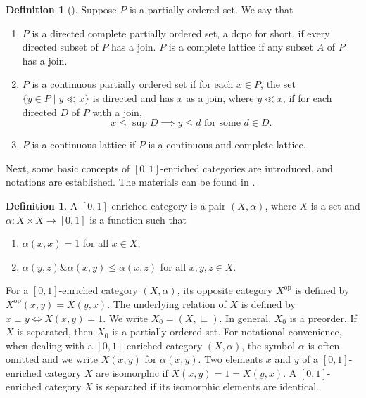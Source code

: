 \documentclass[preprint,3p,times]{elsarticle}
\theoremstyle{plain}
\theoremstyle{definition}
\newtheorem{definition}[thm]{Definition}
\numberwithin{equation}{section}
\begin{document}
\begin{definition}[\cite{Gierz}]
   Suppose \(P\) is a partially  ordered set. We say that 
 \begin{enumerate}[label={\rm(\arabic*)}]
     \item \(P\) is a directed complete partially ordered set, a dcpo for short, if every directed subset of $P$ has a join. \(P\) is a complete lattice  if  any subset \(A\) of \(P\) has a join.
     \item \(P\) is a continuous partially ordered set if for each $x \in P$, the set $\{y \in P \mid y \ll x\}$ is directed and has $x$ as a join, where  \(y \ll x \), if for each directed \(D\) of \(P\) with a join, \[x\le \sup D \implies y\le d \text{ for some \(d\in D.\)}\]
     \item \(P\) is a continuous lattice if \(P\) is a continuous and complete lattice.
 \end{enumerate}

\end{definition}
Next, some basic concepts of \([0,1]\)-enriched categories are introduced, and  notations are established. The materials can be found in \cite{Zhang2024IntroductoryNO,LAI20201,Lai2019CompletelyDE}. 
\begin{definition}
	A \([0,1]\)-enriched category is a pair $(X, \alpha)$, where $X$ is a set and $\alpha: X \times X \to [0,1]$ is a function such that
	\begin{enumerate}[label={\rm(\arabic*)}]
		\item $\alpha(x, x) = 1$ for all $x \in X$;
		\item  $\alpha(y, z) \& \alpha(x, y) \leq \alpha(x, z)$ for all $x, y, z \in X$.
	\end{enumerate}
\end{definition}
For a $[0,1]$-enriched category $(X,\alpha)$, its opposite category
$X^{\mathrm{op}}$ is defined by
\(
X^{\mathrm{op}}(x,y)=X(y,x).
\)
The underlying relation of $X$ is defined by
\(
x\sqsubseteq y
\Longleftrightarrow
X(x,y)=1.
\)
We write
\(
X_0=(X,\sqsubseteq).
\)
In general, $X_0$ is a preorder. If $X$ is separated, then
$X_0$ is a partially ordered set.
For notational convenience, when dealing with a \([0,1]\)-enriched category \((X,\alpha)\), the symbol \(\alpha\) is often omitted and we write $X(x,y)$ for $\alpha(x,y)$.
Two elements $x$ and $y$ of a \([0,1]\)-enriched category $X$ are isomorphic if $X(x,y) = 1 = X(y,x)$. A \([0,1]\)-enriched category $X$ is separated if its isomorphic elements are identical.
\end{document}
